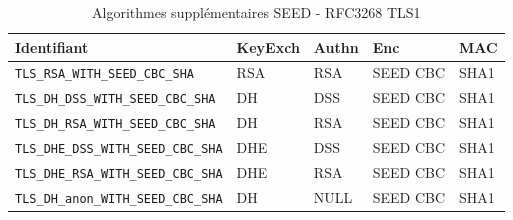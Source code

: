 \begin{table}[H]
\centering
\begin{tabularx}{17cm}{|l|l|l|X|l|}
\hline
\textbf{Identifiant} & \textbf{KeyExch} & \textbf{Authn}& \textbf{Enc}& \textbf{MAC}\\
\hline
\verb+TLS_RSA_WITH_SEED_CBC_SHA+&RSA&RSA&SEED CBC&SHA1\\
\hline
\verb+TLS_DH_DSS_WITH_SEED_CBC_SHA+&DH&DSS&SEED CBC&SHA1\\
\hline 
\verb+TLS_DH_RSA_WITH_SEED_CBC_SHA+&DH&RSA&SEED CBC&SHA1\\
\hline 
\verb+TLS_DHE_DSS_WITH_SEED_CBC_SHA+&DHE&DSS&SEED CBC&SHA1\\
\hline
\verb+TLS_DHE_RSA_WITH_SEED_CBC_SHA+&DHE&RSA&SEED CBC&SHA1\\
\hline
\verb+TLS_DH_anon_WITH_SEED_CBC_SHA+ &DH&NULL&SEED CBC&SHA1\\
\hline
\end{tabularx}
\caption{Algorithmes supplémentaires SEED - RFC3268 TLS1}
\label{algosTLSRFCSEED}
\end{table}


